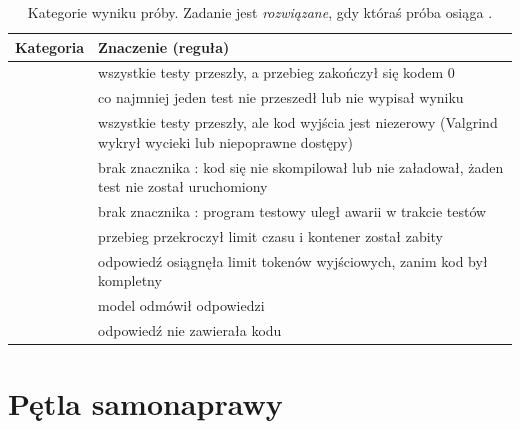 \begin{table}[htbp]
  \centering
  \caption{Kategorie wyniku próby. Zadanie jest \emph{rozwiązane}, gdy któraś próba osiąga
    .}
  \label{tab:outcomes}
  \small
  \begin{tabularx}{\textwidth}{@{}lY@{}}
    \toprule
    Kategoria & Znaczenie (reguła) \\
    \midrule
              & wszystkie testy przeszły, a przebieg zakończył się kodem 0 \\
     & co najmniej jeden test nie przeszedł lub nie wypisał wyniku \\
      & wszystkie testy przeszły, ale kod wyjścia jest niezerowy (Valgrind wykrył wycieki lub niepoprawne dostępy) \\
     & brak znacznika : kod się nie skompilował lub nie załadował, żaden test nie został uruchomiony \\
     & brak znacznika : program testowy uległ awarii w trakcie testów \\
           & przebieg przekroczył limit czasu i kontener został zabity \\
         & odpowiedź osiągnęła limit tokenów wyjściowych, zanim kod był kompletny \\
           & model odmówił odpowiedzi \\
      & odpowiedź nie zawierała kodu \\
    \bottomrule
  \end{tabularx}
\end{table}

\section{Pętla samonaprawy}
\label{sec:repair-loop}

